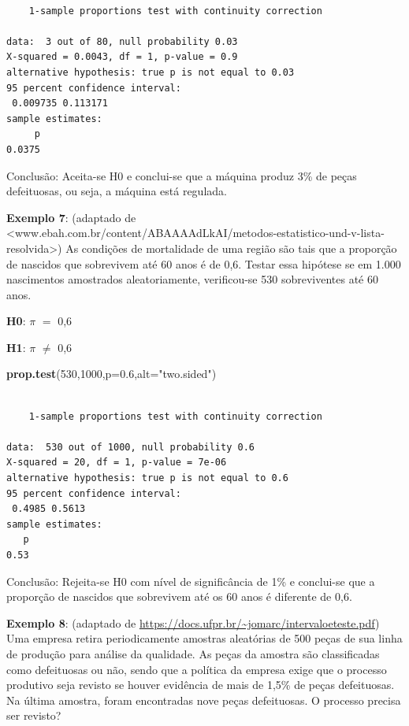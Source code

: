 \documentclass[12pt,portuguese,oneside]{book}
\newenvironment{Shaded}{\begin{snugshade}}{\end{snugshade}}
\newcommand{\KeywordTok}[1]{\textcolor[rgb]{0.13,0.29,0.53}{\textbf{#1}}}
\newcommand{\DataTypeTok}[1]{\textcolor[rgb]{0.13,0.29,0.53}{#1}}
\newcommand{\DecValTok}[1]{\textcolor[rgb]{0.00,0.00,0.81}{#1}}
\newcommand{\FloatTok}[1]{\textcolor[rgb]{0.00,0.00,0.81}{#1}}
\newcommand{\StringTok}[1]{\textcolor[rgb]{0.31,0.60,0.02}{#1}}
\newcommand{\NormalTok}[1]{#1}
\begin{document}
\begin{verbatim}

    1-sample proportions test with continuity correction

data:  3 out of 80, null probability 0.03
X-squared = 0.0043, df = 1, p-value = 0.9
alternative hypothesis: true p is not equal to 0.03
95 percent confidence interval:
 0.009735 0.113171
sample estimates:
     p 
0.0375 
\end{verbatim}

Conclusão: Aceita-se H0 e conclui-se que a máquina produz 3\% de peças
defeituosas, ou seja, a máquina está regulada.

\textbf{Exemplo 7}: (adaptado de
\textless{}www.ebah.com.br/content/ABAAAAdLkAI/metodos-estatistico-und-v-lista-resolvida\textgreater{})
As condições de mortalidade de uma região são tais que a proporção de
nascidos que sobrevivem até 60 anos é de 0,6. Testar essa hipótese se em
1.000 nascimentos amostrados aleatoriamente, verificou-se 530
sobreviventes até 60 anos.

\textbf{H0}: \(\pi\) \(=\) 0,6

\textbf{H1}: \(\pi\) \(\neq\) 0,6

\begin{Shaded}
\begin{Highlighting}[]
\KeywordTok{prop.test}\NormalTok{(}\DecValTok{530}\NormalTok{,}\DecValTok{1000}\NormalTok{,}\DataTypeTok{p=}\FloatTok{0.6}\NormalTok{,}\DataTypeTok{alt=}\StringTok{"two.sided"}\NormalTok{)}
\end{Highlighting}
\end{Shaded}

\begin{verbatim}

    1-sample proportions test with continuity correction

data:  530 out of 1000, null probability 0.6
X-squared = 20, df = 1, p-value = 7e-06
alternative hypothesis: true p is not equal to 0.6
95 percent confidence interval:
 0.4985 0.5613
sample estimates:
   p 
0.53 
\end{verbatim}

Conclusão: Rejeita-se H0 com nível de significância de 1\% e conclui-se
que a proporção de nascidos que sobrevivem até os 60 anos é diferente de
0,6.

\textbf{Exemplo 8}: (adaptado de
\url{https://docs.ufpr.br/~jomarc/intervaloeteste.pdf}) Uma empresa
retira periodicamente amostras aleatórias de 500 peças de sua linha de
produção para análise da qualidade. As peças da amostra são
classificadas como defeituosas ou não, sendo que a política da empresa
exige que o processo produtivo seja revisto se houver evidência de mais
de 1,5\% de peças defeituosas. Na última amostra, foram encontradas nove
peças defeituosas. O processo precisa ser revisto?
\end{document}
